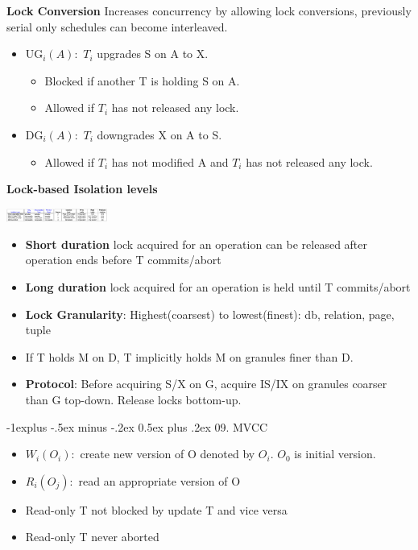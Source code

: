 \documentclass[8pt, landscape]{extarticle}
\makeatletter
\renewcommand{\subsection}{\@startsection{subsection}{2}{0mm}%
  {-1explus -.5ex minus -.2ex}%
  {0.5ex plus .2ex}%
{\normalfont\normalsize\bfseries}}
\makeatother
\begin{document}
\begin{multicols*}{4}
  \textbf{Lock Conversion} Increases concurrency by allowing lock conversions, previously serial only schedules can become interleaved.
  \begin{itemize}
    \item $\text{UG}_i(A):$ $T_i$ upgrades S on A to X.
    \begin{itemize}
      \item Blocked if another T is holding S on A.
      \item Allowed if $T_i$ has not released any lock.
    \end{itemize}
    \item $\text{DG}_i(A):$ $T_i$ downgrades X on A to S.
    \begin{itemize}
      \item Allowed if $T_i$ has not modified A and $T_i$ has not released any lock.
    \end{itemize}
  \end{itemize}

  \textbf{Lock-based Isolation levels}

  \includegraphics[width=0.2486\textwidth]{cs3223-isolation-levels.png} 
  \begin{itemize}
    \item \textbf{Short duration} lock acquired for an operation can be released after operation ends before T commits/abort
    \item \textbf{Long duration} lock acquired for an operation is held until T commits/abort
    \item \textbf{Lock Granularity}: Highest(coarsest) to lowest(finest): db, relation, page, tuple
    \item If T holds M on D, T implicitly holds M on granules finer than D.
    \item \textbf{Protocol}: Before acquiring S/X on G, acquire IS/IX on granules coarser than G top-down. Release locks bottom-up.
  \end{itemize}

  \subsection{09. MVCC}
  \begin{itemize}
    \item $W_i(O_i): $ create new version of O denoted by $O_i$. $O_0$ is initial version.
    \item $R_i(O_j): $ read an appropriate version of O
    \item Read-only T not blocked by update T and vice versa
    \item Read-only T never aborted
  \end{itemize}


\end{multicols*}
\end{document}
